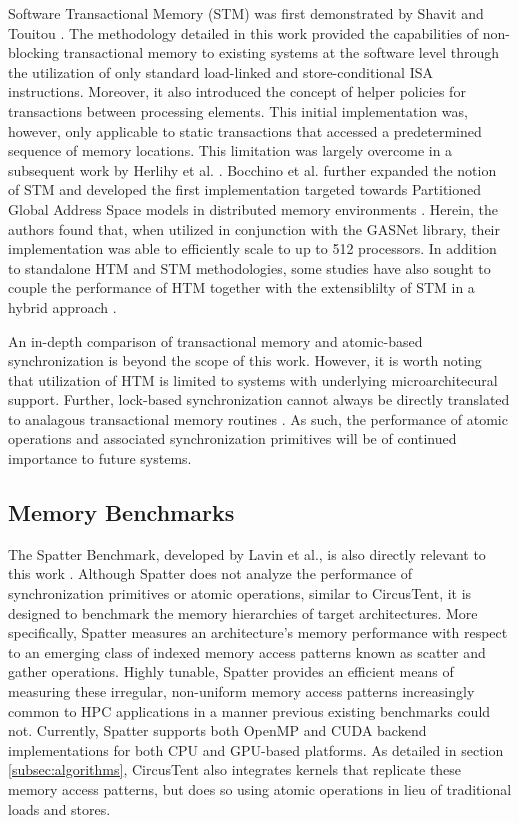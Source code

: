 Software Transactional Memory (STM) was first demonstrated by Shavit and Touitou \cite{shavit1995softwaretm}.
The methodology detailed in this work provided the capabilities of non-blocking transactional memory to existing systems at the software level through the utilization of only standard load-linked and store-conditional ISA instructions.
Moreover, it also introduced the concept of helper policies for transactions between processing elements.
This initial implementation was, however, only applicable to static transactions that accessed a predetermined sequence of memory locations.
This limitation was largely overcome in a subsequent work by Herlihy et al. \cite{herlihy2003stmdsds}.
Bocchino et al. further expanded the notion of STM and developed the first implementation targeted towards Partitioned Global Address Space models in distributed memory environments \cite{bocchino2008stm}.
Herein, the authors found that, when utilized in conjunction with the GASNet library, their implementation was able to efficiently scale to up to 512 processors.
In addition to standalone HTM and STM methodologies, some studies have also sought to couple the performance of HTM together with the extensiblilty of STM in a hybrid approach \cite{baugh2008using}.

An in-depth comparison of transactional memory and atomic-based synchronization is beyond the scope of this work.
However, it is worth noting that utilization of HTM is limited to systems with underlying microarchitecural support.
Further, lock-based synchronization cannot always be directly translated to analagous transactional memory routines \cite{blundell2006subtleties}.
As such, the performance of atomic operations and associated synchronization primitives will be of continued importance to future systems.

\subsection{Memory Benchmarks}
\label{subsec:memory_bench}

The Spatter Benchmark, developed by Lavin et al., is also directly relevant to this work \cite{lavin2018spatter}.
Although Spatter does not analyze the performance of synchronization primitives or atomic operations, similar to CircusTent, it is designed to benchmark the memory hierarchies of target architectures.
More specifically, Spatter measures an architecture's memory performance with respect to an emerging class of indexed memory access patterns known as scatter and gather operations.
Highly tunable, Spatter provides an efficient means of measuring these irregular, non-uniform memory access patterns increasingly common to HPC applications in a manner previous existing benchmarks could not.
Currently, Spatter supports both OpenMP and CUDA backend implementations for both CPU and GPU-based platforms.
As detailed in section \ref{subsec:algorithms}, CircusTent also integrates kernels that replicate these memory access patterns, but does so using atomic operations in lieu of traditional loads and stores.

